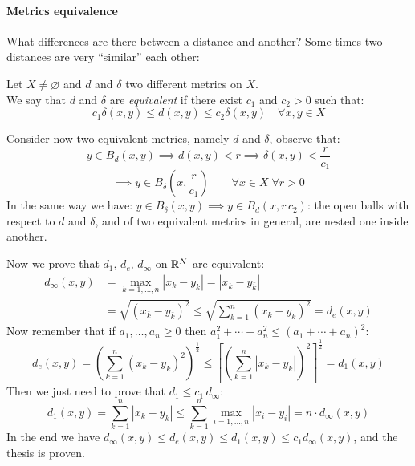 \paragraph{Metrics equivalence} What differences are there between a distance and another? Some times two distances are very ``similar'' each other:
\begin{defn} \label{equivalent-metrics}
	Let $X\neq \varnothing$ and $d$ and $\delta$ two different metrics on $X$.\\
	We say that $d$ and $\delta$ are \emph{equivalent} if there exist $c_1$ and $c_2>0$ such that:
	$$
	c_1\delta\left(x,y\right)
	\leq d\left(x,y\right)
	\leq c_2\delta\left(x,y\right) 
	\quad \forall x,y \in X$$
\end{defn}

Consider now two equivalent metrics, namely $d$ and $\delta$, observe that:
$$y \in B_d\left(x,y\right) \implies d\left(x,y\right) < r \implies \delta\left(x,y\right) < \frac r {c_1}$$
$$\implies y \in B_\delta \left(x,\frac r {c_1}\right) \qquad \forall x \in X \; \forall r > 0$$
In the same way we have: $y \in B_\delta\left(x,y\right) \implies y \in B_d \left(x,r\,c_2\right)$: the open balls with respect to $d$ and $\delta$, and of two equivalent metrics in general, are nested one inside another.

\begin{exam}
	Now we prove that $d_1, \, d_e, \, d_\infty$ on $\mathbb R^N$ are equivalent:
	\begin{align*}
		d_\infty (x,y) &= \max_{k=1, \ldots, n} |x_k-y_k| = |x_{\bar{k}}-y_{\bar{k}}| \\
		&=\sqrt{\left(x_{\bar{k}} - y_{\bar{k}} \right)^2} \leq \sqrt{\sum_{k=1}^{n}\left(x_k-y_k\right)^2} =d_e\left(x,y\right)
	\end{align*}
	Now remember that if $a_1,\ldots,a_n\geq0$ then $a_1^2+\cdots+a_n^2\leq \left(a_1+\cdots+a_n\right)^2$:
	$$d_e \left(x,y\right) = \left(\sum_{k=1}^{n}\left(x_k-y_k\right)^2\right)^{\frac 1 2} \leq \left[ \left(\sum_{k=1}^{n}|x_k-y_k|\right)^2 \right]^{\frac 1 2} = d_1\left(x,y\right)$$
	Then we just need to prove that $d_1 \le c_1\,d_\infty$:
	$$d_1\left(x,y\right) = \sum_{k=1}^{n}|x_k-y_k| \leq \sum_{k=1}^{n} \max_{i=1, \ldots, n} |x_i-y_i| = n \cdot d_\infty\left(x,y\right)$$
	In the end we have $d_\infty(x, y) \le d_e(x, y) \le d_1(x, y) \le c_1 d_\infty(x, y)$, and the thesis is proven.
\end{exam} 

